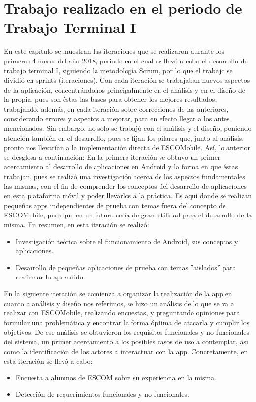 \newline
\section{Trabajo realizado en el periodo de Trabajo Terminal I}

\noindent
En este capítulo se muestran las iteraciones que se realizaron durante los primeros 4 meses del año 2018, periodo en el cual se llevó a cabo el desarrollo de trabajo terminal I, siguiendo la metodología Scrum, por lo que el trabajo se dividió en sprints (iteraciones). Con cada iteración se trabajaban nuevos aspectos de la aplicación, concentrándonos principalmente en el análisis y en el diseño de la propia, pues son éstas las bases para obtener los mejores resultados, trabajando, además, en cada iteración sobre correcciones de las anteriores, considerando errores y aspectos a mejorar, para en efecto llegar a los antes mencionados. Sin embargo, no solo se trabajó con el análisis y el diseño, poniendo atención también en el desarrollo, pues se fijan los pilares que, junto al análisis, pronto nos llevarían a la implementación directa de ESCOMobile. Así, lo anterior se desglosa a continuación: 
\newline
\newline
En la primera iteración se obtuvo un primer acercamiento al desarrollo de aplicaciones en Android y la forma en que éstas trabajan, pues se realizó una investigación acerca de los aspectos fundamentales las mismas, con el fin de comprender los conceptos del desarrollo de aplicaciones en esta plataforma móvil y poder llevarlos a la práctica. Es aquí donde se realizan pequeñas apps independientes de prueba con temas fuera del concepto de ESCOMobile, pero que en un futuro sería de gran utilidad para el desarrollo de la misma. En resumen, en esta iteración se realizó: 
\begin{itemize}
	\item Investigación teórica sobre el funcionamiento de Android, sus conceptos y aplicaciones.
	\item Desarrollo de pequeñas aplicaciones de prueba con temas ''aislados'' para reafirmar lo aprendido.
\end{itemize}

\noindent
En la siguiente iteración se comienza a organizar la realización de la app en cuanto a análisis y diseño nos referimos, se hizo un análisis de lo que se va a realizar con ESCOMobile, realizando encuestas, y preguntando opiniones para formular una problemática y encontrar la forma óptima de atacarla y cumplir los objetivos. De ese análisis se obtuvieron los requisitos funcionales y no funcionales del sistema, un primer acercamiento a los posibles casos de uso a contemplar, así como la identificación de los actores a interactuar con la app. Concretamente, en esta iteración se llevó a cabo: 
\begin{itemize}
	\item Encuesta a alumnos de ESCOM sobre su experiencia en la misma.
	\item Detección de requerimientos funcionales y no funcionales.
\end{itemize}

